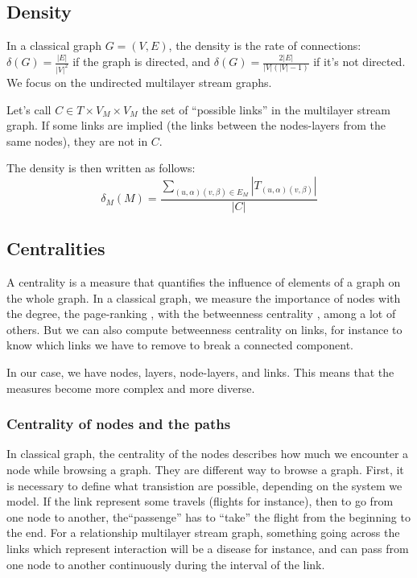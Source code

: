 \documentclass{svproc}
\begin{document}
\subsection{Density}
%
In a classical graph $G=(V,E)$, the density is the rate of connections: $\delta(G)= \frac{|E|}{|V|^2}$ if the graph is directed, and  $\delta(G)= \frac{2|E|}{|V|(|V|-1)}$ if it's not directed. We focus on the undirected multilayer stream graphs.

\begin{definition}	Let's call $C \in T \times V_M\times V_M$ the set of ``possible links'' in the multilayer stream graph. If some links are implied (the links between the nodes-layers from the same nodes), they are not in $C$.

	The density is then written as follows:
	\[
		\delta_M (M)
		= \frac{\sum_{(u,\alpha)(v,\beta) \in E_M}|T_{(u,\alpha)(v,\beta)}|}{|C|}
	\]
\end{definition}



\subsection{Centralities}
%
A centrality is a measure that quantifies the influence of elements of a graph on the whole graph. In a classical graph, we measure the importance of nodes with the degree, the page-ranking \cite{pr}, with the betweenness centrality \cite{btw}, among a lot of others. But we can also compute betweenness centrality on links, for instance to know which links we have to remove to break a connected component.

In our case, we have nodes, layers, node-layers, and links. This means that the measures become more complex and more diverse.

%
\subsubsection{Centrality of nodes and the paths}
%
In classical graph, the centrality of the nodes describes how much we encounter a node while browsing a graph. They are different way to browse a graph. First, it is necessary to define what transistion are possible, depending on the system we model. If the link represent some travels (flights for instance), then to go from one node to another, the``passenge'' has to ``take'' the flight from the beginning to the end. For a relationship multilayer stream graph, something going across the links which represent interaction will be a disease for instance, and can pass from one node to another continuously during the interval of the link.  
\end{document}
